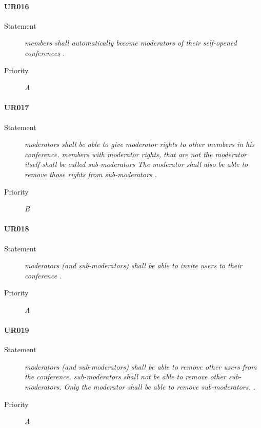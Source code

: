 \paragraph{UR016}
  \begin{description}
  \item [Statement] 
    \textit{ \gls{member}s shall automatically become \gls{moderator}s of their self-opened \gls{conference}s
    .}
  \item [Priority] \textit{A}
\end{description}
    
\paragraph{UR017}
  \begin{description}
  \item [Statement] 
    \textit{ \gls{moderator}s shall be able to give \gls{moderator} rights to other \gls{member}s in his \gls{conference}.
            \gls{member}s with \gls{moderator} rights, that are not the \gls{moderator} itself shall be called \gls{sub-moderator}s
            The \gls{moderator} shall also be able to remove those rights from \gls{sub-moderator}s
    .}
  \item [Priority] \textit{B}
\end{description}

\paragraph{UR018}
  \begin{description}
  \item [Statement] 
    \textit{ \gls{moderator}s (and \gls{sub-moderator}s) shall be able to invite \gls{user}s to their \gls{conference}
    .}
  \item [Priority] \textit{A}
\end{description}

\paragraph{UR019}
  \begin{description}
  \item [Statement] 
    \textit{ \gls{moderator}s (and \gls{sub-moderator}s) shall be able to remove other \gls{user}s from the \gls{conference}.
            \gls{sub-moderator}s shall not be able to remove other \gls{sub-moderator}s.
            Only the \gls{moderator} shall be able to remove \gls{sub-moderator}s.
    .}
  \item [Priority] \textit{A}
\end{description}
    
